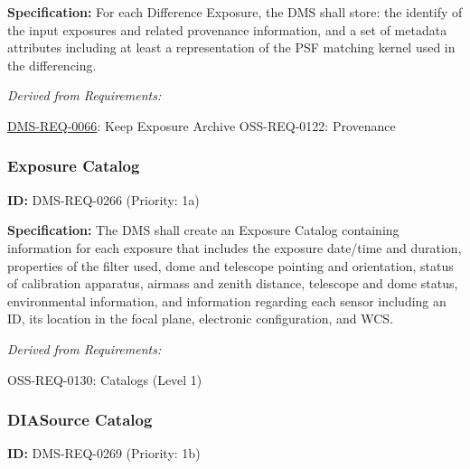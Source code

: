 \documentclass[SE,toc,lsstdraft]{lsstdoc}
\begin{document}
\textbf{Specification:} For each Difference Exposure, the DMS shall store: the identify of the input exposures and related provenance information, and a set of metadata attributes including at least a representation of the PSF matching kernel used in the differencing.

\emph{Derived from Requirements:}

\hyperref[DMS-REQ-0066]{DMS-REQ-0066}:
Keep Exposure Archive \newline
OSS-REQ-0122:
Provenance \newline

\subsubsection{Exposure Catalog}

\label{DMS-REQ-0266}
\textbf{ID:} DMS-REQ-0266 (Priority: 1a)

\textbf{Specification:} The DMS shall create an Exposure Catalog containing information for each exposure that includes the exposure date/time and duration, properties of the filter used, dome and telescope pointing and orientation, status of calibration apparatus, airmass and zenith distance, telescope and dome status, environmental information, and information regarding each sensor including an ID, its location in the focal plane, electronic configuration, and WCS.

\emph{Derived from Requirements:}

OSS-REQ-0130:
Catalogs (Level 1) \newline

\subsubsection{DIASource Catalog}

\label{DMS-REQ-0269}
\textbf{ID:} DMS-REQ-0269 (Priority: 1b)
\end{document}
